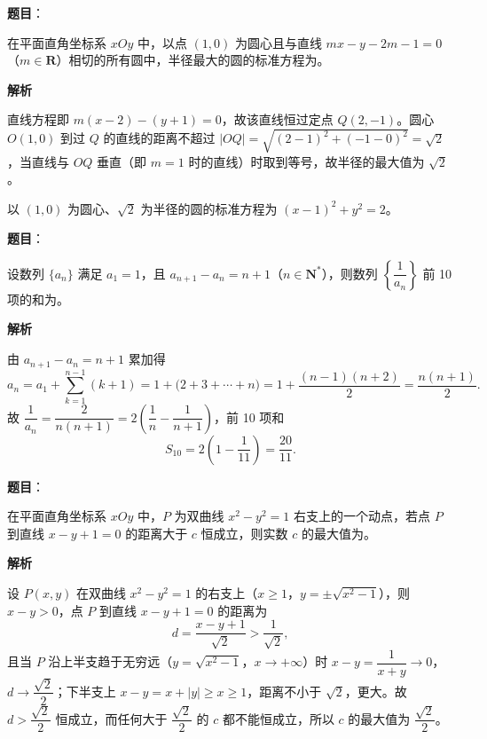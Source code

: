 \begin{answer}

\textbf{题目}：

在平面直角坐标系 \(xOy\) 中，以点 \((1,0)\) 为圆心且与直线 \(mx-y-2m-1=0\)（\(m\in\mathbf{R}\)）相切的所有圆中，半径最大的圆的标准方程为\gkblank{}。

\textbf{解析}

直线方程即 \(m(x-2)-(y+1)=0\)，故该直线恒过定点 \(Q(2,-1)\)。圆心 \(O(1,0)\) 到过 \(Q\) 的直线的距离不超过 \(|OQ|=\sqrt{(2-1)^{2}+(-1-0)^{2}}=\sqrt{2}\)，当直线与 \(OQ\) 垂直（即 \(m=1\) 时的直线）时取到等号，故半径的最大值为 \(\sqrt{2}\)。

以 \((1,0)\) 为圆心、\(\sqrt{2}\) 为半径的圆的标准方程为 \((x-1)^{2}+y^{2}=2\)。


\end{answer}
\begin{answer}

\textbf{题目}：

设数列 \(\{a_{n}\}\) 满足 \(a_{1}=1\)，且 \(a_{n+1}-a_{n}=n+1\)（\(n\in\mathbf{N}^{*}\)），则数列 \(\left\{\dfrac{1}{a_{n}}\right\}\) 前 10 项的和为\gkblank{}。

\textbf{解析}

由 \(a_{n+1}-a_{n}=n+1\) 累加得
\nopagebreak[4]
\[
a_{n}=a_{1}+\sum_{k=1}^{n-1}(k+1)=1+\bigl(2+3+\cdots+n\bigr)=1+\frac{(n-1)(n+2)}{2}=\frac{n(n+1)}{2}.
\]
故 \(\dfrac{1}{a_{n}}=\dfrac{2}{n(n+1)}=2\left(\dfrac{1}{n}-\dfrac{1}{n+1}\right)\)，前 10 项和
\nopagebreak[4]
\[
S_{10}=2\left(1-\frac{1}{11}\right)=\frac{20}{11}.
\]


\end{answer}
\begin{answer}

\textbf{题目}：

在平面直角坐标系 \(xOy\) 中，\(P\) 为双曲线 \(x^{2}-y^{2}=1\) 右支上的一个动点，若点 \(P\) 到直线 \(x-y+1=0\) 的距离大于 \(c\) 恒成立，则实数 \(c\) 的最大值为\gkblank{}。

\textbf{解析}

设 \(P(x,y)\) 在双曲线 \(x^{2}-y^{2}=1\) 的右支上（\(x\geqslant1\)，\(y=\pm\sqrt{x^{2}-1}\)），则 \(x-y>0\)，点 \(P\) 到直线 \(x-y+1=0\) 的距离为
\nopagebreak[4]
\[
d=\frac{x-y+1}{\sqrt{2}}>\frac{1}{\sqrt{2}},
\]
且当 \(P\) 沿上半支趋于无穷远（\(y=\sqrt{x^{2}-1}\)，\(x\to+\infty\)）时 \(x-y=\dfrac{1}{x+y}\to 0\)，\(d\to\dfrac{\sqrt{2}}{2}\)；下半支上 \(x-y=x+|y|\geqslant x\geqslant1\)，距离不小于 \(\sqrt{2}\)，更大。故 \(d>\dfrac{\sqrt{2}}{2}\) 恒成立，而任何大于 \(\dfrac{\sqrt{2}}{2}\) 的 \(c\) 都不能恒成立，所以 \(c\) 的最大值为 \(\dfrac{\sqrt{2}}{2}\)。


\end{answer}
